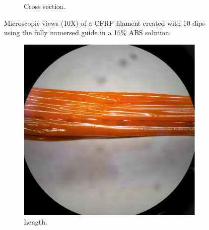 \begin{figure}[h!]
\begin{subfigure}[b]{0.3\textwidth}
                \caption{Cross section.}
                \label{fig:filament-108-40-dip-end}
        \end{subfigure}
        \caption{Microscopic views (10X) of a CFRP filament created with 10 dips using the fully immersed guide in a 16\% ABS solution.}\label{fig:filament-108-40-dip-microscope}
\end{figure}


\begin{figure}[h!]
        \centering
        \begin{subfigure}[b]{0.3\textwidth}
                \includegraphics[width=\textwidth]{./figures/filament-108-40-flat-side}
                \caption{Length.}
                \label{fig:filament-108-40-flat-side}
        \end{subfigure}
        \begin{subfigure}[b]{0.3\textwidth}

\end{subfigure}
\end{figure}
